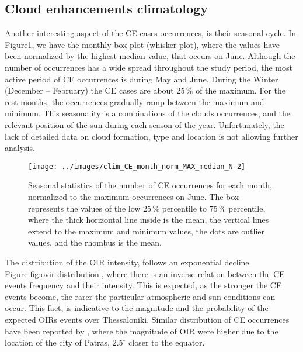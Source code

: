 \documentclass[preprint, 5p,
authoryear]{elsarticle} %
\begin{document}
\hypertarget{cloud-enhancements-climatology}{%
\subsection{Cloud enhancements
climatology}\label{cloud-enhancements-climatology}}

Another interesting aspect of the CE cases occurrences, is their
seasonal cycle. In
Figure\nobreakspace{}\ref{fig:relative-month-occurrences}, we have the
monthly box plot (whisker plot), where the values have been normalized
by the highest median value, that occurs on June. Although the number of
occurrences has a wide spread throughout the study period, the most
active period of CE occurrences is during May and June. During the
Winter (December -- February) the CE cases are about \(25\,\%\) of the
maximum. For the rest months, the occurrences gradually ramp between the
maximum and minimum. This seasonality is a combinations of the clouds
occurrences, and the relevant position of the sun during each season of
the year. Unfortunately, the lack of detailed data on cloud formation,
type and location is not allowing further analysis.

\begin{figure}

{\centering \texttt{[image: ../images/clim\_CE\_month\_norm\_MAX\_median\_N-2]} 

}

\caption{Seasonal statistics of the number of CE occurrences for each month, normalized to the maximum occurrences on June. The box represents the values of the low $25\,\%$ percentile to $75\,\%$ percentile, where the thick horizontal line inside is the mean, the vertical lines extend to the maximum and minimum values, the dots are outlier values, and the rhombus is the mean.}\label{fig:relative-month-occurrences}
\end{figure}

The distribution of the OIR intensity, follows an exponential decline
Figure\nobreakspace{}\ref{fig:ovir-distribution}, where there is an
inverse relation between the CE events frequency and their intensity.
This is expected, as the stronger the CE events become, the rarer the
particular atmospheric and sun conditions can occur. This fact, is
indicative to the magnitude and the probability of the expected OIRs
events over Thessaloniki. Similar distribution of CE occurrences have
been reported by \citet{Vamvakas2020}, where the magnitude of OIR were
higher due to the location of the city of Patras, \(2.5^\circ\) closer
to the equator.
\end{document}
